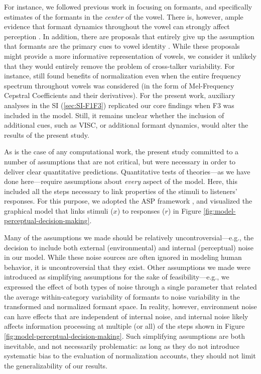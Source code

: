 \documentclass[preprint]{JASA}
\begin{document}
For instance, we followed previous work in focusing on formants, and specifically estimates of the formants in the \emph{center} of the vowel. There is, however, ample evidence that formant dynamics throughout the vowel can strongly affect perception \citetext{\citealp[\citet{hillenbrand-nearey1999}]{assmann-katz2005}; \citealp{nearey-assmann1986}}. In addition, there are proposals that entirely give up the assumption that formants are the primary cues to vowel identity \citep[e.g., whole-spectrum accounts,][]{hillenbrand2006}. While these proposals might provide a more informative representation of vowels, we consider it unlikely that they would entirely remove the problem of cross-talker variability. For instance, \citet{richter2017} still found benefits of normalization even when the entire frequency spectrum throughout vowels was considered (in the form of Mel-Frequency Cepstral Coefficients and their derivatives). For the present work, auxiliary analyses in the SI (\ref{sec:SI-F1F3}) replicated our core findings when F3 was included in the model. Still, it remains unclear whether the inclusion of additional cues, such as VISC, or additional formant dynamics, would alter the results of the present study.

As is the case of any computational work, the present study committed to a number of assumptions that are not critical, but were necessary in order to deliver clear quantitative predictions. Quantitative tests of theories---as we have done here---require assumptions about \emph{every} aspect of the model. Here, this included all the steps necessary to link properties of the stimuli to listeners' responses. For this purpose, we adopted the ASP framework \citep{xie2023}, and visualized the graphical model that links stimuli (\(x\)) to responses (\(r\)) in Figure \ref{fig:model-perceptual-decision-making}.

Many of the assumptions we made should be relatively uncontroversial---e.g., the decision to include both external (environmental) and internal (perceptual) noise in our model. While these noise sources are often ignored in modeling human behavior, it is uncontroversial that they exist. Other assumptions we made were introduced as simplifying assumptions for the sake of feasibility---e.g., we expressed the effect of both types of noise through a single parameter that related the average within-category variability of formants to noise variability in the transformed and normalized formant space. In reality, however, environment noise can have effects that are independent of internal noise, and internal noise likely affects information processing at multiple (or all) of the steps shown in Figure \ref{fig:model-perceptual-decision-making}. Such simplifying assumptions are both inevitable, and not necessarily problematic: as long as they do not introduce systematic bias to the evaluation of normalization accounts, they should not limit the generalizability of our results.
\end{document}
